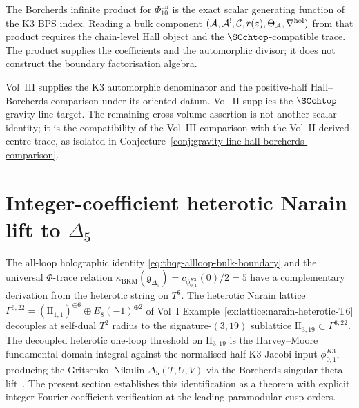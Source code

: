 \begin{remark}
\label{rem:thqg-borcherds-is-holographic-atom}
The Borcherds infinite product for $\Phi_{10}^{\mathrm{un}}$ is the exact scalar
generating function of the K3 BPS index. Reading a bulk component
$(\mathcal{A},\mathcal{A}^!,\mathcal{C},r(z),\Theta_{\mathcal{A}},\nabla^{\mathrm{hol}})$ from that
product requires the chain-level Hall object and the
$\SCchtop$-compatible trace. The product supplies the coefficients
and the automorphic divisor; it does not construct the boundary
factorisation algebra.
\end{remark}

\begin{remark}
\label{rem:thqg-allloop-cross-volume}
Vol~III supplies the K3 automorphic denominator and the
positive-half Hall--Borcherds comparison under its oriented datum.
Vol~II supplies the $\SCchtop$ gravity-line target. The remaining
cross-volume assertion is not another scalar identity; it is the
compatibility of the Vol~III comparison with the Vol~II derived-centre
trace, as isolated in
Conjecture~\ref{conj:gravity-line-hall-borcherds-comparison}.
\end{remark}

\section{Integer-coefficient heterotic Narain lift to $\Delta_5$}
\label{sec:thqg-heterotic-lift-integers}

The all-loop holographic identity
\eqref{eq:thqg-allloop-bulk-boundary} and the universal
$\Phi$-trace relation
$\kappa_{\mathrm{BKM}}(\mathfrak{g}_{\Delta_5})
=c_{\phi_{0,1}^{K3}}(0)/2=5$ have a
complementary derivation from the heterotic string on $T^6$. The
heterotic Narain lattice $\Gamma^{6,22} = (\mathrm{II}_{1,1})^{\oplus 6}
\oplus E_8(-1)^{\oplus 2}$ of Vol~I
Example~\ref{ex:lattice:narain-heterotic-T6} decouples at self-dual
$T^2$ radius to the signature-$(3,19)$ sublattice
$\mathrm{II}_{3,19}\subset\Gamma^{6,22}$. The decoupled heterotic
one-loop threshold on $\mathrm{II}_{3,19}$ is the
Harvey--Moore~\cite[\S 6]{HarveyMoore1996} fundamental-domain
integral against the normalised half K3 Jacobi input $\phi_{0,1}^{K3}$,
producing
the Gritsenko--Nikulin $\Delta_5(T, U, V)$ via the Borcherds
singular-theta lift~\cite[Theorem~13.3]{Borcherds1998}. The present
section establishes this identification as a theorem with explicit
integer Fourier-coefficient verification at the leading
paramodular-cusp orders.

